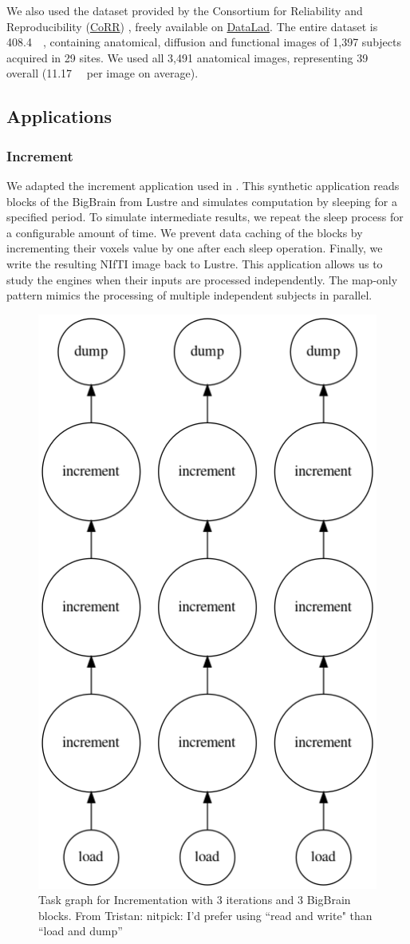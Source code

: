 \documentclass[conference]{IEEEtran}
\newcommand{\TG}[1]{\color{cyan}From Tristan: #1 \color{black}}
\begin{document}
We also used the dataset provided by the Consortium for Reliability and
Reproducibility
(\href{http://fcon_1000.projects.nitrc.org/indi/CoRR/html/}{CoRR})
\cite{zuo2014open}, freely available on
\href{https://datasets.datalad.org/?dir=/corr/RawDataBIDS}{DataLad}. The
entire dataset is \SI{408.4}{\giga\byte}, containing anatomical, diffusion
and functional images of 1,397 subjects acquired in 29 sites. We used all
3,491 anatomical images, representing \SI{39}{\giga\byte} overall
(\SI{11.17}{\mega\byte} per image on average).

\subsection{Applications}

\subsubsection{Increment}

We adapted the increment application used in \cite{hayot2019performance}.
This synthetic application reads blocks of the BigBrain from Lustre and
simulates computation by sleeping for a specified period. To simulate
intermediate results, we repeat the sleep process for a configurable amount
of time. We prevent data caching of the blocks by incrementing their voxels
value by one after each sleep operation. Finally, we write the resulting
NIfTI image back to Lustre. This application allows us to study the engines
when their inputs are processed independently. The map-only pattern
 mimics the processing of multiple independent subjects in
parallel.


\begin{figure}[!ht]
	\centering
	\includegraphics[height=\columnwidth,
	angle=0]{figures/increment.png}
	\caption{Task graph for Incrementation with 3 iterations and 3 BigBrain blocks.
	\TG{nitpick: I'd prefer using ``read and write" than ``load and dump''}}
	\label{fig:graph-increment}
\end{figure}
\end{document}
